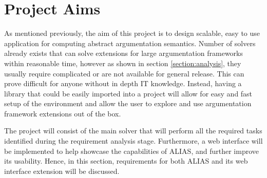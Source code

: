 \section{Project Aims}
As mentioned previously, the aim of this project is to design scalable, easy to use application for computing abstract argumentation semantics. Number of solvers already exists that can solve extensions for large argumentation frameworks within reasonable time, however as shown in section \ref{section:analysis}, they usually require complicated or are not available for general release. This can prove difficult for anyone without in depth IT knowledge. Instead, having a library that could be easily imported into a project will allow for easy and fast setup of the environment and allow the user to explore and use argumentation framework extensions out of the box.

The project will consist of the main solver that will perform all the required tasks identified during the requirement analysis stage. Furthermore, a web interface will be implemented to help showcase the capabilities of ALIAS, and further improve its usability. Hence, in this section, requirements for both ALIAS and its web interface extension will be discussed. 